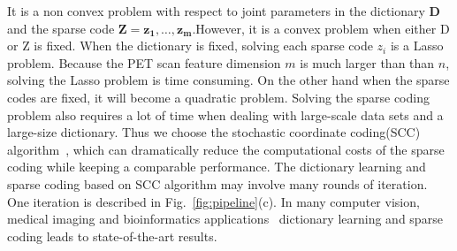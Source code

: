 It is a non convex problem with respect to joint parameters in the dictionary  $\mathbf{D}$ and the sparse code $ \mathbf{Z} = \mathbf{z_1},\dots,\mathbf{z_m} $.However, it is a convex problem when either D or Z is fixed. When the dictionary is fixed, solving each sparse code $z_i$ is a Lasso problem. Because the PET scan feature dimension $m$ is much larger than than $n$, solving the Lasso problem is time consuming. On the other hand when the sparse codes are fixed, it will become a quadratic problem. Solving the sparse coding problem also requires a lot of time when dealing with large-scale data sets and a large-size dictionary. Thus we choose the stochastic coordinate coding(SCC) algorithm~\citep{lin2014stochastic}, which can dramatically reduce the computational costs of the sparse coding while keeping a comparable performance. The dictionary learning and sparse coding based on SCC algorithm may involve many rounds of iteration. One iteration is described in Fig.~\ref{fig:pipeline}(c). In many computer vision, medical imaging and bioinformatics applications~\citep{mairal2009online,zhang2010discriminative,lv2015modeling} dictionary learning and sparse coding leads to state-of-the-art results.

